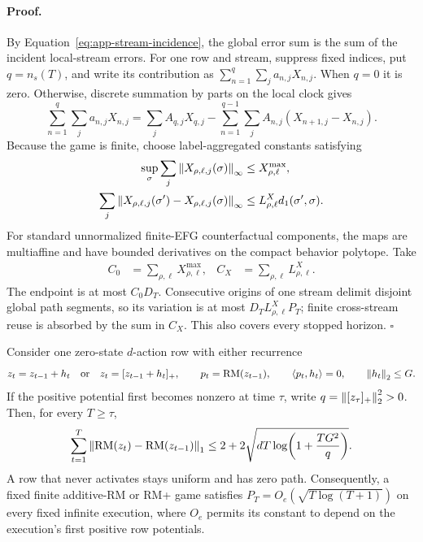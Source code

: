 \paragraph{Proof.}
By Equation~\ref{eq:app-stream-incidence}, the global error sum is the sum of
the incident local-stream errors.  For one row and stream, suppress fixed
indices, put $q=n_s(T)$, and write its contribution as
$\sum_{n=1}^{q}\sum_j a_{n,j}X_{n,j}$.  When $q=0$ it is zero.  Otherwise,
discrete summation by parts on the local clock gives
\begin{equation}
\sum_{n=1}^{q}\sum_j a_{n,j}X_{n,j}
=\sum_j A_{q,j}X_{q,j}
-\sum_{n=1}^{q-1}\sum_j A_{n,j}(X_{n+1,j}-X_{n,j}).
\label{eq:app-abel}
\end{equation}
Because the game is finite, choose label-aggregated constants satisfying
\begin{align}
\sup_\sigma\sum_j\left\lVert X_{\rho,\ell,j}(\sigma) \right\rVert_\infty
&\le X^{\max}_{\rho,\ell},\\
\sum_j\left\lVert X_{\rho,\ell,j}(\sigma')-
X_{\rho,\ell,j}(\sigma) \right\rVert_\infty
&\le L^X_{\rho,\ell}d_1(\sigma',\sigma).
\end{align}
For standard unnormalized finite-EFG counterfactual components, the maps are
multiaffine and have bounded derivatives on the compact behavior polytope.
Take
\begin{align}
C_0&=\sum_{\rho,\ell}X^{\max}_{\rho,\ell},&
C_X&=\sum_{\rho,\ell}L^X_{\rho,\ell}.
\label{eq:app-structural-constants}
\end{align}
The endpoint is at most $C_0D_T$.  Consecutive origins of one stream delimit
disjoint global path segments, so its variation is at most
$D_TL^X_{\rho,\ell}P_T$; finite cross-stream reuse is absorbed by the sum in
$C_X$.  This also covers every stopped horizon. \hfill$\square$

\begin{lemma}
\label{lem:app-rm-log-path}
Consider one zero-state $d$-action row with either recurrence
\begin{equation}
z_t=z_{t-1}+h_t
\quad\text{or}\quad
z_t=[z_{t-1}+h_t]_+,
\qquad p_t=\operatorname{RM}(z_{t-1}),\qquad
\langle p_t,h_t\rangle=0,\qquad \left\lVert h_t \right\rVert_2\le G.
\label{eq:app-rm-row}
\end{equation}
If the positive potential first becomes nonzero at time $\tau$, write
$q=\left\lVert [z_\tau]_+ \right\rVert_2^2>0$.  Then, for every $T\ge\tau$,
\begin{equation}
\sum_{t=1}^T
\left\lVert \operatorname{RM}(z_t)-\operatorname{RM}(z_{t-1}) \right\rVert_1
\le 2+2\sqrt{dT\log\!\left(1+\frac{TG^2}{q}\right)}.
\label{eq:app-rm-path-bound}
\end{equation}
A row that never activates stays uniform and has zero path.  Consequently, a
fixed finite additive-RM or RM+ game satisfies
$P_T=O_e(\sqrt{T\log(T+1)})$ on every fixed infinite execution, where $O_e$
permits its constant to depend on the execution's first positive row
potentials.
\end{lemma}


